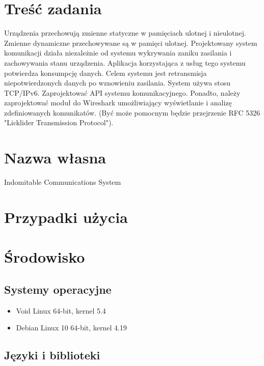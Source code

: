 \documentclass{article}
\begin{document}
\section{Treść zadania\label{tresc}}

Urządzenia przechowują zmienne statyczne w pamięciach ulotnej i nieulotnej. Zmienne dynamiczne przechowywane są w pamięci ulotnej. Projektowany system komunikacji działa niezależnie od systemu wykrywania zaniku zasilania i zachowywania stanu urządzenia. Aplikacja korzystająca z usług tego systemu potwierdza konsumpcję danych. Celem systemu jest retransmisja niepotwierdzonych danych po wznowieniu zasilania. System używa stosu TCP/IPv6. Zaprojektować API systemu komunikacyjnego. Ponadto, należy zaprojektować moduł do Wireshark umożliwiający wyświetlanie i analizę zdefiniowanych komunikatów. (Być może pomocnym będzie przejrzenie RFC 5326 "Licklider Transmission Protocol").

\section{Nazwa własna\label{nazwa}}

Indomitable Communications System

\section{Przypadki użycia\label{przyp}}



\section{Środowisko\label{srod}}

\subsection{Systemy operacyjne}

\begin{itemize}

\item Void Linux 64-bit, kernel 5.4
\item Debian Linux 10 64-bit, kernel 4.19

\end{itemize}

\subsection{Języki i biblioteki}
\end{document}
